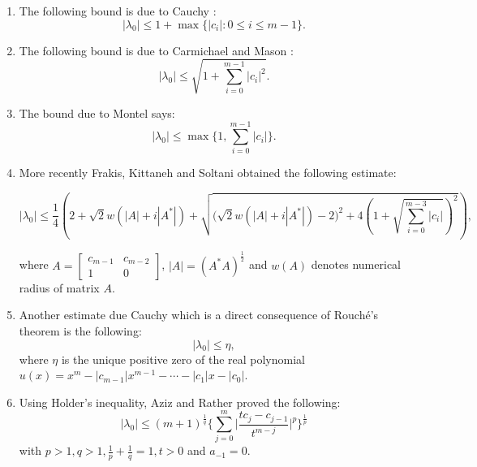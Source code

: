 \documentclass[12pt, reqno]{amsart}
\theoremstyle{definition}
\theoremstyle{remark}
\numberwithin{equation}{section}
\begin{document}
\begin{enumerate}
\item The following bound is due to Cauchy \cite{Horn-Johnson}:
\begin{equation}\label{eq-Cauchy}
|\lambda_0| \leq 1 + \max \{|c_i| : 0 \leq i \leq m-1 \}.
\end{equation}
\item The following bound is due to Carmichael and Mason \cite{Horn-Johnson}:
\begin{equation}\label{eq-Carmichael and Mason}
|\lambda_0| \leq \displaystyle \sqrt{1+ \sum_{i=0}^{m-1}|c_i|^2}.
\end{equation}
\item The bound due to Montel \cite{Horn-Johnson} says:
\begin{equation}\label{eq-Montel}
|\lambda_0| \leq \max \Bigg\{1, \sum_{i=0}^{m-1} |c_i| \Bigg\}.
\end{equation}
\item More recently Frakis, Kittaneh and Soltani \cite{Abdelkader-Faud-Soumia} obtained 
the following estimate:
\begin{smaller}
\begin{equation}\label{eq-Frakis, Kittaneh and Soltani}
|\lambda_0| \leq  \frac{1}{4} \left(2+ \sqrt{2}w(|A|+i|A^*|)+ \sqrt{\Big(\sqrt{2}w(|A|+i|A^*|) 
-2 \Big)^2 +4 \left(1+\sqrt{\sum_{i=0}^{m-3}|c_i|}\right)^2} \right),
\end{equation}
\end{smaller}
where $A = \begin{bmatrix}
c_{m-1} & c_{m-2} \\
1 & 0
\end{bmatrix}$, $|A| = (A^*A)^{\frac{1}{2}}$ and $w(A)$ denotes numerical radius of 
matrix $A$.
\item Another estimate due Cauchy \cite{Cauchy} which is a direct consequence of 
Rouch\'e's theorem is the following:
\begin{equation}\label{eq-Cauchy-Rouche}
|\lambda_0| \leq \eta,
\end{equation}
where $\eta$ is the unique positive zero of the real polynomial $u(x) = x^m - 
|c_{m-1}|x^{m-1} - \cdots - |c_1| x -|c_0|$.
\item Using Holder's inequality, Aziz and Rather \cite{Aziz-Rather} proved the following:
\begin{equation}\label{eq-Aziz-Rather}
|\lambda_0| \leq (m+1)^{\frac{1}{q}} \Bigg \{ \displaystyle \sum_{j=0}^{m} \bigg| 
\frac{tc_j-c_{j-1}}{t^{m-j}}\bigg|^p \Bigg\} ^{\frac{1}{p}}
\end{equation}
with $p>1, q>1, \frac{1}{p}+\frac{1}{q}=1, t>0$ and $a_{-1} =0$.
\end{enumerate}
\end{document}
